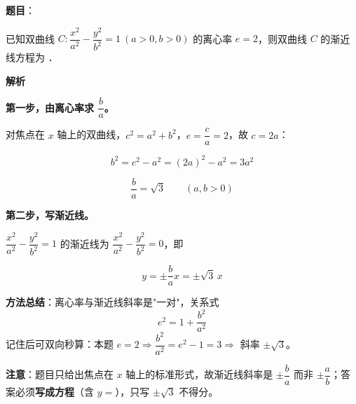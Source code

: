 \begin{answer}

\textbf{题目}：

已知双曲线 $C:\dfrac{x^{2}}{a^{2}}-\dfrac{y^{2}}{b^{2}}=1\ (a>0,b>0)$ 的离心率 $e=2$，则双曲线 $C$ 的渐近线方程为 \gkblank{}．

\textbf{解析}

\textbf{第一步，由离心率求 $\dfrac ba$。}

对焦点在 $x$ 轴上的双曲线，$c^{2}=a^{2}+b^{2}$，$e=\dfrac ca=2$，故 $c=2a$：

\nopagebreak[4]
\[b^{2}=c^{2}-a^{2}=(2a)^{2}-a^{2}=3a^{2}\]

\nopagebreak[4]
\[\frac{b}{a}=\sqrt3\qquad(a,b>0)\]

\textbf{第二步，写渐近线。}

$\dfrac{x^{2}}{a^{2}}-\dfrac{y^{2}}{b^{2}}=1$ 的渐近线为 $\dfrac{x^{2}}{a^{2}}-\dfrac{y^{2}}{b^{2}}=0$，即

\nopagebreak[4]
\[y=\pm\frac ba x=\pm\sqrt3\,x\]

\begin{gktip}
\textbf{方法总结}：离心率与渐近线斜率是"一对"，关系式
\nopagebreak[4]
\[e^{2}=1+\frac{b^{2}}{a^{2}}\]
记住后可双向秒算：本题 $e=2\Rightarrow\dfrac{b^{2}}{a^{2}}=e^{2}-1=3\Rightarrow$ 斜率 $\pm\sqrt3$。

\textbf{注意}：题目只给出焦点在 $x$ 轴上的标准形式，故渐近线斜率是 $\pm\dfrac ba$ 而非 $\pm\dfrac ab$；答案必须\textbf{写成方程}（含 $y=$），只写 $\pm\sqrt3$ 不得分。
\end{gktip}


\par\medskip

\end{answer}
